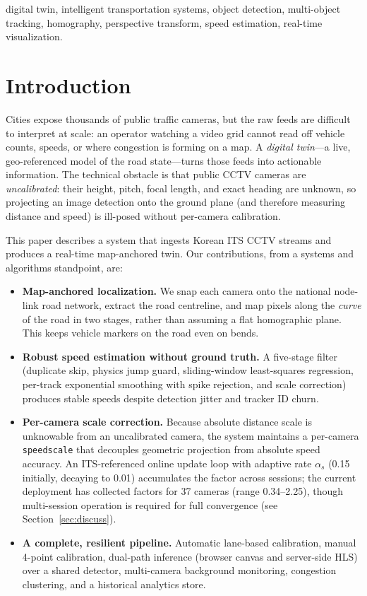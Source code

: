 \documentclass[conference]{IEEEtran}
\renewcommand{\_}{\textunderscore\allowbreak}
\begin{document}
\begin{IEEEkeywords}
digital twin, intelligent transportation systems, object detection, multi-object
tracking, homography, perspective transform, speed estimation, real-time
visualization.
\end{IEEEkeywords}

\section{Introduction}
Cities expose thousands of public traffic cameras, but the raw feeds are difficult
to interpret at scale: an operator watching a video grid cannot read off vehicle
counts, speeds, or where congestion is forming on a map. A \emph{digital twin}---a
live, geo-referenced model of the road state---turns those feeds into actionable
information. The technical obstacle is that public CCTV cameras are
\emph{uncalibrated}: their height, pitch, focal length, and exact heading are
unknown, so projecting an image detection onto the ground plane (and therefore
measuring distance and speed) is ill-posed without per-camera calibration.

This paper describes a system that ingests Korean ITS CCTV streams and produces a
real-time map-anchored twin. Our contributions, from a systems and algorithms
standpoint, are:

\begin{itemize}
  \item \textbf{Map-anchored localization.} We snap each camera onto the national
  node-link road network, extract the road centreline, and map pixels along the
  \emph{curve} of the road in two stages, rather than assuming a flat homographic
  plane. This keeps vehicle markers on the road even on bends.
  \item \textbf{Robust speed estimation without ground truth.} A five-stage filter
  (duplicate skip, physics jump guard, sliding-window least-squares regression,
  per-track exponential smoothing with spike rejection, and scale correction)
  produces stable speeds despite detection jitter and tracker ID churn.
  \item \textbf{Per-camera scale correction.} Because absolute distance scale is
  unknowable from an uncalibrated camera, the system maintains a per-camera
  \texttt{speed\_scale} that decouples geometric projection from absolute speed
  accuracy. An ITS-referenced online update loop with adaptive rate $\alpha_s$ (0.15 initially, decaying to 0.01) accumulates the factor across sessions; the current deployment has collected
  factors for 37 cameras (range 0.34--2.25), though multi-session operation is required for full convergence (see Section~\ref{sec:discuss}).
  \item \textbf{A complete, resilient pipeline.} Automatic lane-based calibration,
  manual 4-point calibration, dual-path inference (browser canvas and server-side
  HLS) over a shared detector, multi-camera background monitoring, congestion
  clustering, and a historical analytics store.
\end{itemize}
\end{document}
